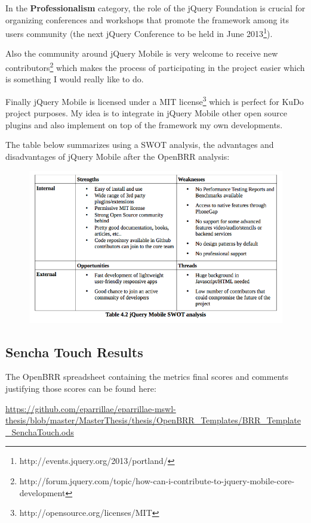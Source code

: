 \documentclass[a4paper,12pt]{book}
\begin{document}
In the \textbf{Professionalism} category, the role of the jQuery Foundation is crucial for organizing conferences and workshops that promote the framework among its users community (the next jQuery Conference to be held in June 2013\footnote{http://events.jquery.org/2013/portland/}).

Also the community around jQuery Mobile is very welcome to receive new contributors\footnote{http://forum.jquery.com/topic/how-can-i-contribute-to-jquery-mobile-core-development} which makes the process of participating in the project easier which is something I would really like to do.

Finally jQuery Mobile is licensed under a MIT license\footnote{http://opensource.org/licenses/MIT} which is perfect for KuDo project purposes. My idea is to integrate in jQuery Mobile other open source plugins and also implement on top of the framework my own developments.

The table below summarizes using a SWOT analysis, the advantages and disadvantages of jQuery Mobile after the OpenBRR analysis:

\begin{figure}[H]
    \centering
    \includegraphics[width=12cm, keepaspectratio]{img/table42.png}
 \end{figure}

\subsection{Sencha Touch Results}
\label{Sencha Touch Results}

The OpenBRR spreadsheet containing the metrics final scores and comments justifying those scores can be found here:

\url{
https://github.com/eparrillae/eparrillae-mswl-thesis/blob/master/MasterThesis/thesis/OpenBRR_Templates/BRR_Template_SenchaTouch.ods}
\end{document}
